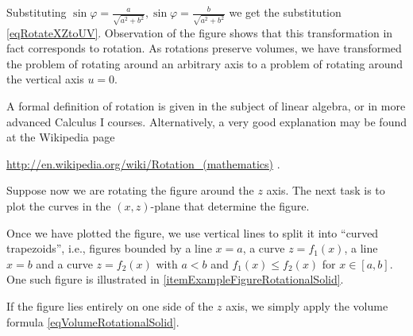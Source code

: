 \documentclass[12pt]{book}
\begin{document}
Substituting $\sin \varphi = \frac{a}{\sqrt{a^2+b^2}}, \sin \varphi = \frac{b}{\sqrt{a^2+b^2}}$ we get the substitution \eqref{eqRotateXZtoUV}. Observation of the figure shows that this transformation in fact corresponds to rotation. As rotations preserve volumes, we have transformed the problem of rotating around an arbitrary axis to a problem of rotating around the vertical axis $u=0$.

A formal definition of rotation is given in the subject of linear algebra, or in more advanced Calculus I courses. Alternatively, a very good explanation may be found at the Wikipedia page

\url{http://en.wikipedia.org/wiki/Rotation_(mathematics)} .

Suppose now we are rotating the figure around the $z$ axis. The next task is to plot the curves in the $(x,z)$-plane that determine the figure.

Once we have plotted the figure, we use vertical lines to split it into ``curved trapezoids'', i.e.,  figures bounded by a line $x=a$, a curve $z=f_1(x)$, a line $x=b$ and a curve $z=f_2(x)$ with $a< b$ and $f_1(x)\leq f_2(x)$ for $x\in [a,b]$. One such figure is illustrated in \ref{itemExampleFigureRotationalSolid}.

If the figure lies entirely on one side of the $z$ axis, we simply apply the volume formula  \eqref{eqVolumeRotationalSolid}. 
\end{document}
